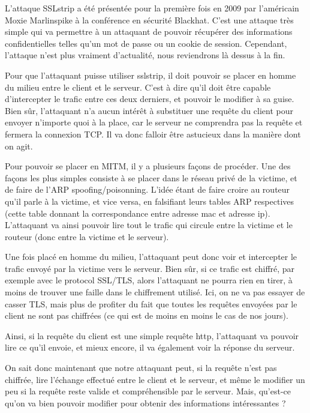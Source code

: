 L'attaque SSLstrip a été présentée pour la première fois en 2009 par l'américain Moxie Marlinspike à la conférence en sécurité Blackhat. C'est une attaque très simple qui va permettre à un attaquant de pouvoir récupérer des informations confidentielles telles qu'un mot de passe ou un cookie de session. Cependant, l'attaque n'est plus vraiment d'actualité, nous reviendrons là dessus à la fin.

Pour que l'attaquant puisse utiliser sslstrip, il doit pouvoir se placer en homme du milieu entre le client et le serveur. C'est à dire qu'il doit être capable d'intercepter le trafic entre ces deux derniers, et pouvoir le modifier à sa guise. Bien sûr, l'attaquant n'a aucun intérêt à substituer une requête du client pour envoyer n'importe quoi à la place, car le serveur ne comprendra pas la requête et fermera la connexion TCP. Il va donc falloir être astucieux dans la manière dont on agit.

Pour pouvoir se placer en MITM, il y a plusieurs façons de procéder. Une des façons les plus simples consiste à se placer dans le réseau privé de la victime, et de faire de l'ARP spoofing/poisonning. L'idée étant de faire croire au routeur qu'il parle à la victime, et vice versa, en falsifiant leurs tables ARP respectives (cette table donnant la correspondance entre adresse mac et adresse ip). L'attaquant va ainsi pouvoir lire tout le trafic qui circule entre la victime et le routeur (donc entre la victime et le serveur).

Une fois placé en homme du milieu, l'attaquant peut donc voir et intercepter le trafic envoyé par la victime vers le serveur. Bien sûr, si ce trafic est chiffré, par exemple avec le protocol SSL/TLS, alors l'attaquant ne pourra rien en tirer, à moins de trouver une faille dans le chiffrement utilisé. Ici, on ne va pas essayer de casser TLS, mais plus de profiter du fait que toutes les requêtes envoyées par le client ne sont pas chiffrées (ce qui est de moins en moins le cas de nos jours).

Ainsi, si la requête du client est une simple requête http, l'attaquant va pouvoir lire ce qu'il envoie, et mieux encore, il va également voir la réponse du serveur.

On sait donc maintenant que notre attaquant peut, si la requête n'est pas chiffrée, lire l'échange effectué entre le client et le serveur, et même le modifier un peu si la requête reste valide et compréhensible par le serveur. Mais, qu'est-ce qu'on va bien pouvoir modifier pour obtenir des informations intéressantes ?

